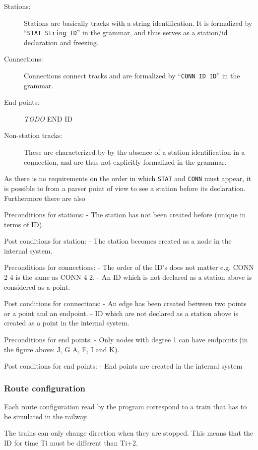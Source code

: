 \documentclass[10pt,a4paper]{article}
\begin{document}
\begin{description}
\item[Stations:] Stations are basically tracks with a string identification. It is formalized by ``\texttt{STAT String ID}'' in the grammar, and thus serves as a station/id declaration and freezing.
\item[Connections:] Connections connect tracks and are formalized by ``\texttt{CONN ID ID}'' in the grammar.
\item[End points:] \emph{TODO} END ID
\item[Non-station tracks:] These are characterized by by the absence of a station identification in a connection, and are thus not explicitly formalized in the grammar.
\end{description} 

As there is no requirements on the order in which \texttt{STAT} and \texttt{CONN} must appear, it is possible to from a parser point of view to see a station before its declaration. 
Furthermore there are also 
 
Preconditions for stations:
-          The station has not been created before (unique in terms of ID).
 
Post conditions for station:
-          The station becomes created as a node in the internal system.
 
Preconditions for connections:
-          The order of the ID’s does not matter e.g. CONN 2 4 is the same as CONN 4 2.
-          An ID which is not declared as a station above is considered as a point.
 
Post conditions for connections:
-          An edge has been created between two points or a point and an endpoint.
-          ID which are not declared as a station above is created as a point in the internal system.
 
Preconditions for end points:
-          Only nodes with degree 1 can have endpoints (in the figure above: J, G A, E, I and K).
 
Post conditions for end points:
-          End points are created in the internal system
 
\subsubsection{Route configuration}
 
Each route configuration read by the program correspond to a train that has to be simulated in the railway.
 
The trains can only change direction when they are stopped. This means that the ID for time Ti must be different than Ti+2.
 
\end{document}
